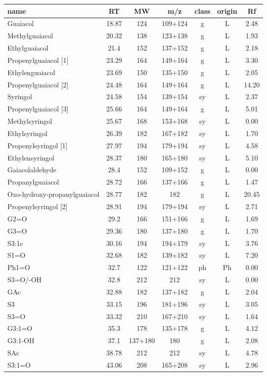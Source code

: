 \begin{table*}
\begin{center}
\begin{tabular}{lcccccc}
name & RT & MW & m/z & class & origin&Rf\\
\hline
Guaiacol&18.87&124&109+124&g&L&2.48\\
Methylguaiacol&20.32&138&123+138&g&L&1.93\\
Ethylguaiacol&21.4&152&137+152&g&L&2.18\\
Propenylguaiacol [1]&23.29&164&149+164&g&L&3.30\\
Ethylenguaiacol&23.69&150&135+150&g&L&2.05\\
Propenylguaiacol [2]&24.48&164&149+164&g&L&14.20\\
Syringol&24.58&154&139+154&sy&L&2.37\\
Propenylguaiacol [3]&25.66&164&149+164&g&L&5.01\\
Methylsyringol&25.67&168&153+168&sy&L&0.00\\
Ethylsyringol&26.39&182&167+182&sy&L&1.70\\
Propenylsyringol [1]&27.97&194&179+194&sy&L&4.58\\
Ethylensyringol&28.37&180&165+180&sy&L&5.10\\
Gaiacolaldehyde&28.4&152&109+152&g&L&0.00\\
Propanylguaiacol&28.72&166&137+166&g&L&1.47\\
Oxo-hydroxy-propanylguaiacol&28.77&182&182&g&L&20.45\\
Propenylsyringol [2]&28.91&194&179+194&sy&L&2.71\\
G2=O&29.2&166&151+166&g&L&1.69\\
G3=O&29.36&180&137+180&g&L&1.70\\
S3:1c&30.16&194&194+179&sy&L&3.76\\
S1=O&32.68&182&139+182&sy&L&7.20\\
Ph1=O&32.7&122&121+122&ph&Ph&0.00\\
S3=O/-OH&32.8&212&212&sy&L&0.00\\
GAc&32.88&182&137+182&g&L&2.04\\
S3&33.15&196&181+196&sy&L&3.05\\
S3=O&33.32&210&167+210&sy&L&1.64\\
G3:1=O&35.3&178&135+178&g&L&4.12\\
G3:1-OH&37.1&137+180&180&g&L&2.08\\
SAc&38.78&212&212&sy&L&4.78\\
S3:1=O&43.06&208&165+208&sy&L&2.96\\


\end{tabular}
\end{center}
\end{table*}
